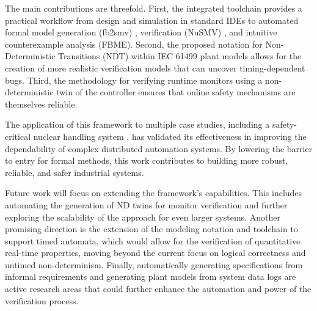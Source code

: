 The main contributions are threefold. First, the integrated toolchain provides a practical workflow from design and simulation in standard IDEs to automated formal model generation (fb2smv) , verification (NuSMV) , and intuitive counterexample analysis (FBME). Second, the proposed notation for Non-Deterministic Transitions (NDT) within IEC 61499 plant models allows for the creation of more realistic verification models that can uncover timing-dependent bugs. Third, the methodology for verifying runtime monitors using a non-deterministic twin of the controller ensures that online safety mechanisms are themselves reliable.

The application of this framework to multiple case studies, including a safety-critical nuclear handling system , has validated its effectiveness in improving the dependability of complex distributed automation systems. By lowering the barrier to entry for formal methods, this work contributes to building more robust, reliable, and safer industrial systems.

Future work will focus on extending the framework's capabilities. This includes automating the generation of ND twins for monitor verification and further exploring the scalability of the approach for even larger systems. Another promising direction is the extension of the modeling notation and toolchain to support timed automata, which would allow for the verification of quantitative real-time properties, moving beyond the current focus on logical correctness and untimed non-determinism. Finally, automatically generating specifications from informal requirements and generating plant models from system data logs are active research areas that could further enhance the automation and power of the verification process.
